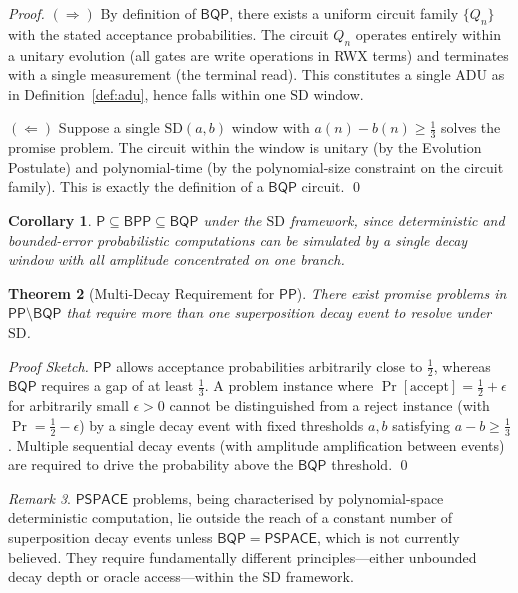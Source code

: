 \documentclass[11pt]{article}
\theoremstyle{plain}
\newtheorem{theorem}{Theorem}[section]
\newtheorem{corollary}[theorem]{Corollary}
\theoremstyle{definition}
\theoremstyle{remark}
\newtheorem{remark}[theorem]{Remark}
\newcommand{\pspace}{\ensuremath{\mathsf{PSPACE}}}
\newcommand{\bqp}{\ensuremath{\mathsf{BQP}}}
\newcommand{\bpp}{\ensuremath{\mathsf{BPP}}}
\newcommand{\pp}{\ensuremath{\mathsf{PP}}}
\newcommand{\Pcls}{\ensuremath{\mathsf{P}}}
\newcommand{\SD}{\ensuremath{\mathrm{SD}}}   %
\begin{document}
\begin{proof}
  $(\Rightarrow)$ By definition of $\bqp$, there exists a uniform circuit
  family $\{Q_n\}$ with the stated acceptance probabilities.  The circuit
  $Q_n$ operates entirely within a unitary evolution (all gates are write
  operations in RWX terms) and terminates with a single measurement (the
  terminal read).  This constitutes a single ADU as in
  Definition~\ref{def:adu}, hence falls within one \SD{} window.

  $(\Leftarrow)$ Suppose a single \SD$(a,b)$ window with $a(n) - b(n) \geq
  \tfrac{1}{3}$ solves the promise problem.  The circuit within the window is
  unitary (by the Evolution Postulate) and polynomial-time (by the
  polynomial-size constraint on the circuit family).  This is exactly the
  definition of a $\bqp$ circuit. \qed
\end{proof}

\begin{corollary}
  $\Pcls \subseteq \bpp \subseteq \bqp$ under the \SD{} framework, since
  deterministic and bounded-error probabilistic computations can be simulated
  by a single decay window with all amplitude concentrated on one branch.
\end{corollary}

\begin{theorem}[Multi-Decay Requirement for \pp]
  \label{thm:pp}
  There exist promise problems in $\pp \setminus \bqp$ that require more than
  one superposition decay event to resolve under \SD.
\end{theorem}

\begin{proof}[Proof Sketch]
  $\pp$ allows acceptance probabilities arbitrarily close to $\tfrac{1}{2}$,
  whereas $\bqp$ requires a gap of at least $\tfrac{1}{3}$.  A problem
  instance where $\Pr[\text{accept}] = \tfrac{1}{2} + \epsilon$ for
  arbitrarily small $\epsilon > 0$ cannot be distinguished from a reject
  instance (with $\Pr = \tfrac{1}{2} - \epsilon$) by a single decay event
  with fixed thresholds $a, b$ satisfying $a - b \geq \tfrac{1}{3}$.  Multiple
  sequential decay events (with amplitude amplification between events) are
  required to drive the probability above the \bqp{} threshold. \qed
\end{proof}

\begin{remark}
  $\pspace$ problems, being characterised by polynomial-space deterministic
  computation, lie outside the reach of a constant number of superposition
  decay events unless $\bqp = \pspace$, which is not currently believed.
  They require fundamentally different principles---either unbounded decay
  depth or oracle access---within the \SD{} framework.
\end{remark}
\end{document}
